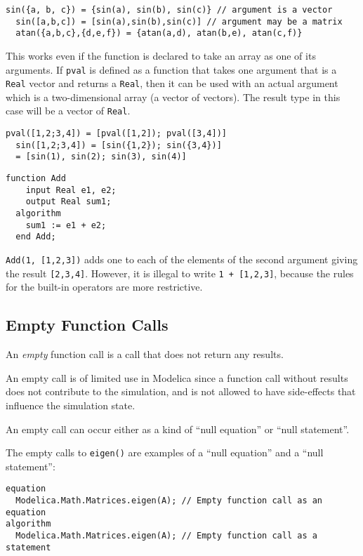 \begin{example}
\begin{lstlisting}[language=modelica]
  sin({a, b, c}) = {sin(a), sin(b), sin(c)} // argument is a vector
  sin([a,b,c]) = [sin(a),sin(b),sin(c)] // argument may be a matrix
  atan({a,b,c},{d,e,f}) = {atan(a,d), atan(b,e), atan(c,f)}
\end{lstlisting}
This works even if the function is declared to take an array as
one of its arguments. If \lstinline!pval! is defined as a function that takes
one argument that is a \lstinline!Real! vector and returns a \lstinline!Real!, then it can
be used with an actual argument which is a two-dimensional array (a
vector of vectors). The result type in this case will be a vector of
\lstinline!Real!.
\begin{lstlisting}[language=modelica]
  pval([1,2;3,4]) = [pval([1,2]); pval([3,4])]
  sin([1,2;3,4]) = [sin({1,2}); sin({3,4})]
  = [sin(1), sin(2); sin(3), sin(4)]
\end{lstlisting}
\begin{lstlisting}[language=modelica]
  function Add
    input Real e1, e2;
    output Real sum1;
  algorithm
    sum1 := e1 + e2;
  end Add;
\end{lstlisting}
\lstinline!Add(1, [1,2,3])! adds one to each of the elements of the second
argument giving the result \lstinline![2,3,4]!. However, it is illegal to
write \lstinline!1 + [1,2,3]!, because the rules for the built-in
operators are more restrictive.
\end{example}

\subsection{Empty Function Calls}

An \emph{empty} function call is a call that does not return any results.

\begin{nonnormative}
An empty call is of limited use in Modelica since a function call without results does not contribute to the simulation, and is not
allowed to have side-effects that influence the simulation state.
\end{nonnormative}

An empty call can occur either as a kind of ``null equation'' or ``null statement''.

\begin{example}
The empty calls to \lstinline!eigen()! are examples of a ``null equation'' and a ``null statement'':
\begin{lstlisting}[language=modelica]
equation
  Modelica.Math.Matrices.eigen(A); // Empty function call as an equation
algorithm
  Modelica.Math.Matrices.eigen(A); // Empty function call as a statement
\end{lstlisting}
\end{example}

